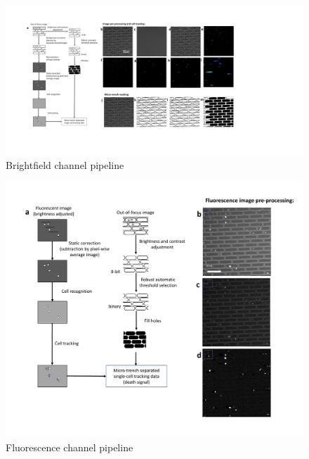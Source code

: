 \documentclass[pdftex,12pt,a4paper]{report}
\begin{document}
\begin{landscape}
\begin{figure}[H]
   \centering
    \includegraphics[height=0.95\textheight]{images/pipeline/01.pdf}
    \caption[Brightfield channel pipeline]{Brightfield channel pipeline}
\end{figure}
\label{fig:pipeline1}
\end{landscape}

\begin{landscape}
\begin{figure}[H]
   \centering
    \includegraphics[height=\textheight]{images/pipeline/02.pdf}
    \caption[Fluoroscence channel pipeline]{Fluorescence channel pipeline}
\end{figure}
\label{fig:pipeline2}
\end{landscape}
\end{document}
